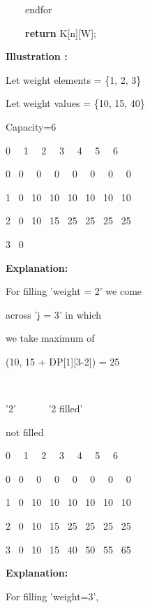 \documentclass[letterpaper]{article}
\begin{document}
\begin{multicols}{2}
{\color[rgb]{0.2509804,0.25882354,0.30588236}
\ \ \ \ endfor}

\textcolor[rgb]{0.2509804,0.25882354,0.30588236}{\ \ \ \ }\textbf{\textcolor[rgb]{0.2509804,0.25882354,0.30588236}{return}}\textcolor[rgb]{0.2509804,0.25882354,0.30588236}{
K[n][W];}

\bigskip
{\bfseries
Illustration :}

Let weight elements = \{1, 2, 3\}

Let weight values = \{10, 15, 40\}

Capacity=6


\bigskip

0 \ \ 1 \ \ 2 \ \ 3 \ \ 4 \ \ 5 \ \ 6


\bigskip

0 \ 0 \ \ 0 \ \ 0 \ \ 0 \ \ 0 \ \ 0 \ \ 0


\bigskip

1 \ 0 \ 10 \ 10 \ 10 \ 10 \ 10 \ 10


\bigskip

2 \ 0 \ 10 \ 15 \ 25 \ 25 \ 25 \ 25


\bigskip

3 \ 0


\bigskip

{\bfseries
Explanation:}

For filling 'weight = 2' we come 

across 'j = 3' in which 

we take maximum of 

(10, 15 + DP[1][3-2]) = 25 \ \ 

\ \ {\textbar} \ \ \ \ \ \ \ {\textbar}

{}'2' \ \ \ \ \ \ {}'2 filled'

not filled \ 


\bigskip

0 \ \ 1 \ \ 2 \ \ 3 \ \ 4 \ \ 5 \ \ 6


\bigskip

0 \ 0 \ \ 0 \ \ 0 \ \ 0 \ \ 0 \ \ 0 \ \ 0


\bigskip

1 \ 0 \ 10 \ 10 \ 10 \ 10 \ 10 \ 10


\bigskip

2 \ 0 \ 10 \ 15 \ 25 \ 25 \ 25 \ 25


\bigskip

3 \ 0 \ 10 \ 15 \ 40 \ 50 \ 55 \ 65


\bigskip

{\bfseries
Explanation:}

For filling 'weight=3', 


\end{multicols}
\end{document}
